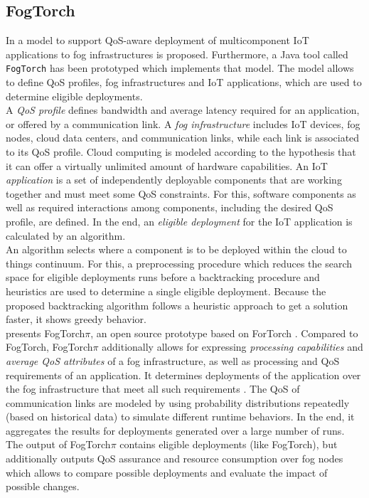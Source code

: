 \subsection*{FogTorch}
In \cite{fogtorch} a model to support QoS-aware deployment of multicomponent IoT applications to fog infrastructures is proposed. Furthermore, a Java tool called \texttt{FogTorch} has been prototyped which implements that model. The model allows to define QoS profiles, fog infrastructures and IoT applications, which are used to determine eligible deployments.\\

A \textit{QoS profile} defines bandwidth and average latency required for an application, or offered by a communication link.
A \textit{fog infrastructure} includes IoT devices, fog nodes, cloud data centers, and communication links, while each link is associated to its QoS profile.
Cloud computing is modeled according to the hypothesis that it can offer a virtually unlimited amount of hardware capabilities.
An IoT \textit{application} is a set of independently deployable components that are working together and must meet some QoS constraints.
For this, software components as well as required interactions among components, including the desired QoS profile, are defined.
In the end, an \textit{eligible deployment} for the IoT application is calculated by an algorithm.\\

An algorithm selects where a component is to be deployed within the cloud to things continuum. For this, a preprocessing procedure which reduces the search space for eligible deployments runs before a backtracking procedure and heuristics are used to determine a single eligible deployment. Because the proposed backtracking algorithm follows a heuristic approach to get a solution faster, it shows greedy behavior.\\

\cite{fogtorchpi} presents FogTorch$\pi$, an open source prototype based on ForTorch \cite{fogtorch}.
Compared to FogTorch, FogTorch$\pi$ additionally allows for expressing \textit{processing capabilities} and \textit{average QoS attributes} of a fog infrastructure, as well as processing and QoS requirements of an application.
It determines deployments of the application over the fog infrastructure that meet all such requirements \cite{fogtorchpi}.
The QoS of communication links are modeled by using probability distributions repeatedly (based on historical data) to simulate different runtime behaviors.
In the end, it aggregates the results for deployments generated over a large number of runs.
The output of FogTorch$\pi$ contains eligible deployments (like FogTorch), but additionally outputs QoS assurance and resource consumption over fog nodes which allows to compare possible deployments and evaluate the impact of possible changes.

